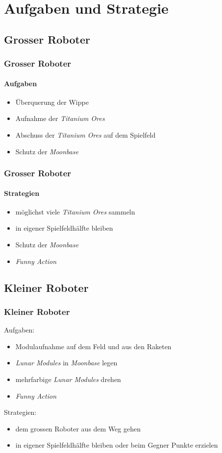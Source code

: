 \section{Aufgaben und Strategie}


\subsection{Grosser Roboter}

\begin{frame}
	\frametitle{Grosser Roboter}
	\framesubtitle{Aufgaben}
	\begin{itemize}
		\item Überquerung der Wippe
		\item Aufnahme der \textit{Titanium Ores}
		\item Abschuss der \textit{Titanium Ores} auf dem Spielfeld
		\item Schutz der \textit{Moonbase} %
	\end{itemize}
\end{frame}

\begin{frame}
	
	
	\frametitle{Grosser Roboter}
	\framesubtitle{Strategien}
	\begin{itemize}
		\item möglichst viele \textit{Titanium Ores} sammeln
		\item in eigener Spielfeldhälfte bleiben
		\item Schutz der \textit{Moonbase}
		\item \textit{Funny Action}
	\end{itemize}
\end{frame}

\subsection{Kleiner Roboter}

\begin{frame}
	\frametitle{Kleiner Roboter}
	Aufgaben:
	\begin{itemize}
		\item Modulaufnahme auf dem Feld und aus den Raketen
		\item \textit{Lunar Modules} in \textit{Moonbase} legen
		\item mehrfarbige \textit{Lunar Modules} drehen
		\item \textit{Funny Action}
	\end{itemize}
	\vspace{1em}
	Strategien:
	\begin{itemize}
		\item dem grossen Roboter aus dem Weg gehen
		\item in eigener Spielfeldhälfte bleiben oder beim Gegner Punkte erzielen
	\end{itemize}
\end{frame}